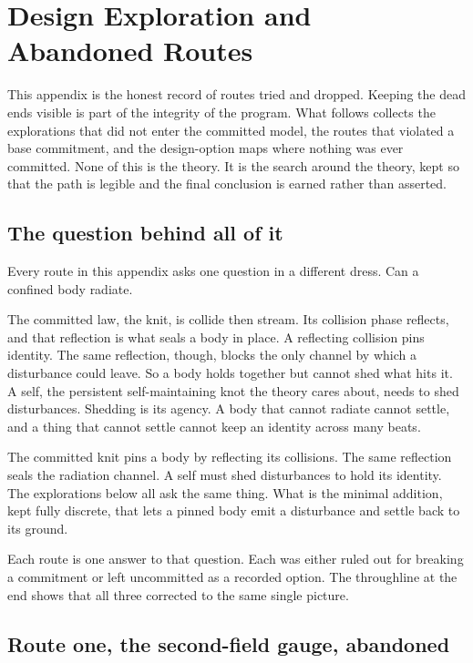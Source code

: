 \section{Design Exploration and Abandoned Routes}

This appendix is the honest record of routes tried and dropped. Keeping the dead ends visible is part of the integrity of the program. What follows collects the explorations that did not enter the committed model, the routes that violated a base commitment, and the design-option maps where nothing was ever committed. None of this is the theory. It is the search around the theory, kept so that the path is legible and the final conclusion is earned rather than asserted.

\subsection{The question behind all of it}

Every route in this appendix asks one question in a different dress. Can a confined body radiate.

The committed law, the knit, is collide then stream. Its collision phase reflects, and that reflection is what seals a body in place. A reflecting collision pins identity. The same reflection, though, blocks the only channel by which a disturbance could leave. So a body holds together but cannot shed what hits it. A self, the persistent self-maintaining knot the theory cares about, needs to shed disturbances. Shedding is its agency. A body that cannot radiate cannot settle, and a thing that cannot settle cannot keep an identity across many beats.

\begin{principle}
The committed knit pins a body by reflecting its collisions. The same reflection seals the radiation channel. A self must shed disturbances to hold its identity. The explorations below all ask the same thing. What is the minimal addition, kept fully discrete, that lets a pinned body emit a disturbance and settle back to its ground.
\end{principle}

Each route is one answer to that question. Each was either ruled out for breaking a commitment or left uncommitted as a recorded option. The throughline at the end shows that all three corrected to the same single picture.

\subsection{Route one, the second-field gauge, abandoned}

